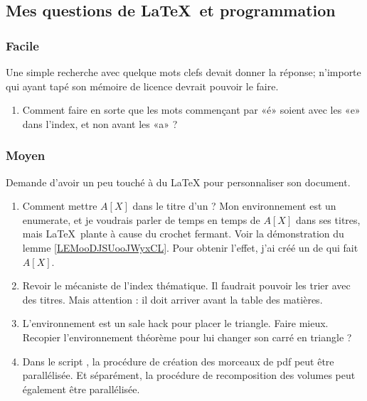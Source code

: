 \subsection{Mes questions de \LaTeX\ et programmation}

\subsubsection{Facile}

Une simple recherche avec quelque mots clefs devait donner la réponse; n'importe qui ayant tapé son mémoire de licence devrait pouvoir le faire.

\begin{enumerate}
    \item
        Comment faire en sorte que les mots commençant par «é» soient avec les «e» dans l'index, et non avant les «a» ?
\end{enumerate}

\subsubsection{Moyen}

Demande d'avoir un peu touché à du \LaTeX{} pour personnaliser son document.

\begin{enumerate}
    \item
        Comment mettre \( A[X]\) dans le titre d'un  ? Mon environnement  est un enumerate, et je voudrais parler de temps en temps de \( A[X]\) dans ses titres, mais \LaTeX\ plante à cause du crochet fermant. Voir la démonstration du lemme \ref{LEMooDJSUooJWyxCL}. Pour obtenir l'effet, j'ai créé un  de  qui fait \( A[X]\).
    \item
        Revoir le mécaniste de l'index thématique. Il faudrait pouvoir les trier avec des titres. Mais attention : il doit arriver avant la table des matières.
    \item 
        L'environnement  est un sale hack pour placer le triangle. Faire mieux. Recopier l'environnement théorème pour lui changer son carré en triangle ?
    \item
        Dans le script , la procédure de création des morceaux de pdf peut être parallélisée. Et séparément, la procédure de recomposition des volumes peut également être parallélisée.
\end{enumerate}


